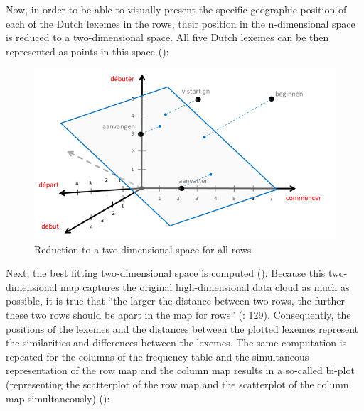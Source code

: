 Now, in order to be able to visually present the specific geographic position of each of the Dutch lexemes in the rows, their position in the n-dimensional space is reduced to a two-dimensional space. All five Dutch lexemes can be then represented as points in this space ():


\begin{figure}
\includegraphics[height=.3\textheight]{figures/Vandevoorde2-img17.png}
\caption{\label{fig:key:17}  Reduction to a two dimensional space for all rows}
\end{figure}


Next, the best fitting two-dimensional space is computed (). Because this two-dimensional map captures the original high-dimensional data cloud as much as possible, it is true that “the larger the distance between two rows, the further these two rows should be apart in the map for rows” (\citealt{baayen_analyzing_2008}: 129). Consequently, the positions of the lexemes and the distances between the plotted lexemes represent the similarities and differences between the lexemes. The same computation is repeated for the columns of the frequency table and the simultaneous representation of the row map and the column map results in a so-called bi-plot (representing the scatterplot of the row map and the scatterplot of the column map simultaneously) ():



